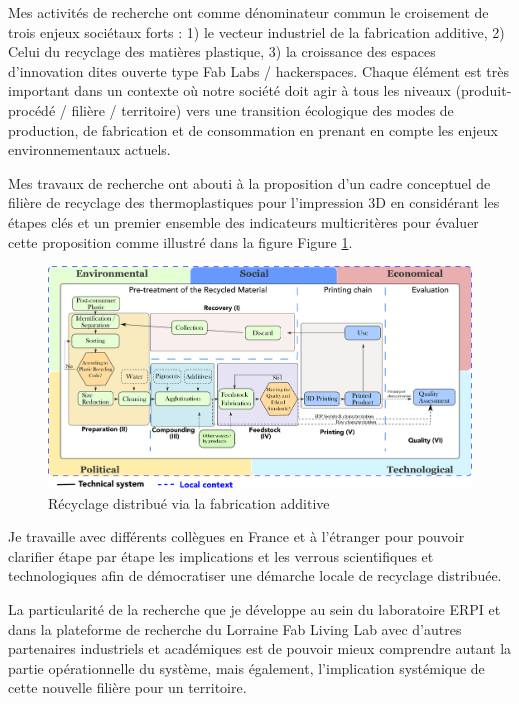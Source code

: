 \documentclass[
  12pt,
  oneside]{book}
\begin{document}
Mes activités de recherche ont comme dénominateur commun le croisement de trois enjeux sociétaux forts : 1) le vecteur industriel de la fabrication additive, 2) Celui du recyclage des matières plastique, 3) la croissance des espaces d'innovation dites ouverte type Fab Labs / hackerspaces. Chaque élément est très important dans un contexte où notre société doit agir à tous les niveaux (produit-procédé / filière / territoire) vers une transition écologique des modes de production, de fabrication et de consommation en prenant en compte les enjeux environnementaux actuels.

Mes travaux de recherche ont abouti à la proposition d'un cadre conceptuel de filière de recyclage des thermoplastiques pour l'impression 3D en considérant les étapes clés et un premier ensemble des indicateurs multicritères pour évaluer cette proposition comme illustré dans la figure Figure \ref{fig:DRAM}.

\begin{figure}

{\centering \includegraphics[width=0.9\linewidth]{Figures/SDRAM-00} 

}

\caption{Récyclage distribué via la fabrication additive}\label{fig:DRAM}
\end{figure}

Je travaille avec différents collègues en France et à l'étranger pour pouvoir clarifier étape par étape les implications et les verrous scientifiques et technologiques afin de démocratiser une démarche locale de recyclage distribuée.

La particularité de la recherche que je développe au sein du laboratoire ERPI et dans la plateforme de recherche du Lorraine Fab Living Lab avec d'autres partenaires industriels et académiques est de pouvoir mieux comprendre autant la partie opérationnelle du système, mais également, l'implication systémique de cette nouvelle filière pour un territoire.
\end{document}
